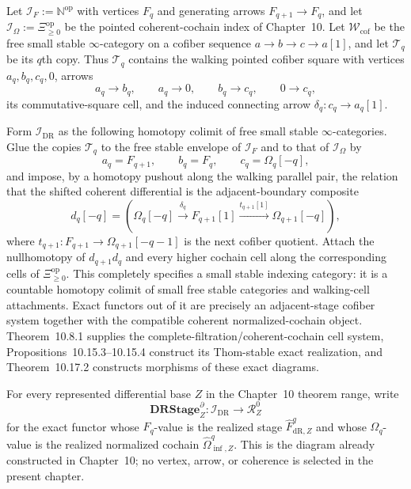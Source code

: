 \begin{construction}
\label{constr:prequantum-realized-dr-stage-diagram}
Let $\mathcal I_F:=\mathbb N^{\mathrm{op}}$ with vertices $F_q$ and generating
arrows $F_{q+1}\to F_q$, and let
$\mathcal I_\Omega:=\Xi_{\ge0}^{\mathrm{op}}$ be the pointed coherent-cochain
index of Chapter~10.  Let $\mathcal W_{\mathrm{cof}}$ be the free small stable
$\infty$-category on a cofiber sequence $a\to b\to c\to a[1]$, and let
$\mathcal T_q$ be its $q$th copy.  Thus $\mathcal T_q$ contains the walking
pointed cofiber square with vertices $a_q,b_q,c_q,0$, arrows
\[
a_q\longrightarrow b_q,\qquad a_q\longrightarrow0,\qquad
b_q\longrightarrow c_q,\qquad0\longrightarrow c_q,
\]
its commutative-square cell, and the induced connecting arrow
$\delta_q:c_q\to a_q[1]$.

Form $\mathcal I_{\mathrm{DR}}$ as the following homotopy colimit of free small
stable $\infty$-categories.  Glue the copies $\mathcal T_q$ to the free stable
envelope of $\mathcal I_F$ and to that of $\mathcal I_\Omega$ by
\[
a_q=F_{q+1},\qquad b_q=F_q,\qquad c_q=\Omega_q[-q],
\]
and impose, by a homotopy pushout along the walking parallel pair, the relation
that the shifted coherent differential is the adjacent-boundary composite
\[
d_q[-q]
=
\left(
\Omega_q[-q]
\xrightarrow{\delta_q}F_{q+1}[1]
\xrightarrow{t_{q+1}[1]}\Omega_{q+1}[-q]
\right),
\]
where $t_{q+1}:F_{q+1}\to\Omega_{q+1}[-q-1]$ is the next cofiber quotient.
Attach the nullhomotopy of $d_{q+1}d_q$ and every higher cochain cell along the
corresponding cells of $\Xi_{\ge0}^{\mathrm{op}}$.  This completely specifies a
small stable indexing category: it is a countable homotopy colimit of small free
stable categories and walking-cell attachments.  Exact functors out of it are
precisely an adjacent-stage cofiber system together with the compatible coherent
normalized-cochain object.  Theorem~10.8.1 supplies the
complete-filtration/coherent-cochain cell system,
Propositions~10.15.3--10.15.4 construct its Thom-stable exact realization, and
Theorem~10.17.2 constructs morphisms of these exact diagrams.

For every represented differential base $Z$ in the Chapter~10 theorem range,
write
\[
\boxed{
\mathbf{DRStage}^{\partial}_Z:
\mathcal I_{\mathrm{DR}}\longrightarrow\mathcal R_Z^0
}
\]
for the exact functor whose $F_q$-value is the realized stage
$\widehat F^q_{\mathrm{dR},Z}$ and whose $\Omega_q$-value is the realized normalized
cochain $\widehat\Omega^q_{\inf,Z}$.  This is the diagram already constructed in
Chapter~10; no vertex, arrow, or coherence is selected in the present chapter.
\end{construction}

